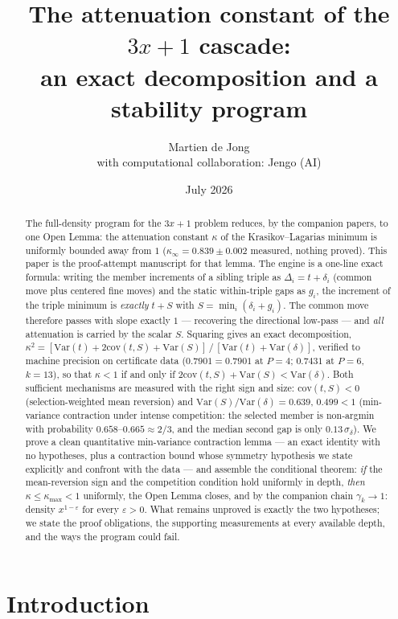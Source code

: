 \documentclass[11pt]{article}
\title{The attenuation constant of the $3x+1$ cascade:\\
an exact decomposition and a stability program}
\author{Martien de Jong\\[3pt]
{\normalsize with computational collaboration: Jengo (AI)}}
\date{July 2026}
\theoremstyle{definition}
\theoremstyle{remark}
\newcommand{\Var}{\mathrm{Var}}
\newcommand{\cov}{\mathrm{cov}}
\newcommand{\gam}{\gamma}
\newcommand{\kap}{\kappa}
\newcommand{\dl}{\delta}
\begin{document}
\maketitle

\begin{abstract}
The full-density program for the $3x+1$ problem reduces, by the companion
papers, to one Open Lemma: the attenuation constant $\kap$ of the
Krasikov--Lagarias minimum is uniformly bounded away from $1$
($\kap_\infty = 0.839 \pm 0.002$ measured, nothing proved). This paper is
the proof-attempt manuscript for that lemma. The engine is a one-line exact
formula: writing the member increments of a sibling triple as
$\Delta_i = t + \dl_i$ (common move plus centered fine moves) and the
static within-triple gaps as $g_i$, the increment of the triple minimum is
\emph{exactly} $t + S$ with $S = \min_i(\dl_i + g_i)$. The common move
therefore passes with slope exactly $1$ --- recovering the directional
low-pass --- and \emph{all} attenuation is carried by the scalar $S$.
Squaring gives an exact decomposition,
$\kap^2 = [\Var(t) + 2\cov(t,S) + \Var(S)]\,/\,[\Var(t) + \Var(\dl)]$,
verified to machine precision on certificate data
($0.7901 = 0.7901$ at $P = 4$; $0.7431$ at $P = 6$, $k = 13$), so that
$\kap < 1$ if and only if $2\cov(t,S) + \Var(S) < \Var(\dl)$. Both
sufficient mechanisms are measured with the right sign and size:
$\cov(t,S) < 0$ (selection-weighted mean reversion) and
$\Var(S)/\Var(\dl) = 0.639$, $0.499 < 1$ (min-variance contraction under
intense competition: the selected member is non-argmin with probability
$0.658$--$0.665 \approx 2/3$, and the median second gap is only
$0.13\,\sigma_\dl$). We prove a clean quantitative min-variance contraction
lemma --- an exact identity with no hypotheses, plus a contraction bound
whose symmetry hypothesis we state explicitly and confront with the data
--- and assemble the conditional theorem: \emph{if} the mean-reversion
sign and the competition condition hold uniformly in depth, \emph{then}
$\kap \leq \kap_{\max} < 1$ uniformly, the Open Lemma closes, and by the
companion chain $\gam_k \to 1$: density $x^{1-\varepsilon}$ for every
$\varepsilon > 0$. What remains unproved is exactly the two hypotheses;
we state the proof obligations, the supporting measurements at every
available depth, and the ways the program could fail.
\end{abstract}

\section{Introduction}
\label{sec:intro}
\end{document}
